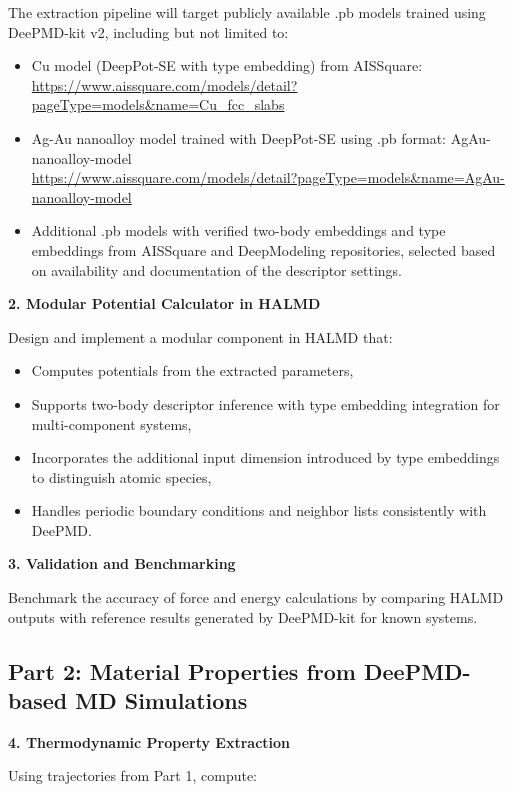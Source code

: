 \documentclass[12pt]{article}
\begin{document}
The extraction pipeline will target publicly available .pb models trained using DeePMD-kit v2, including but not limited to:
\begin{itemize}
    \item Cu model (DeepPot-SE with type embedding) from AISSquare: \url{https://www.aissquare.com/models/detail?pageType=models&name=Cu_fcc_slabs}
    \item Ag-Au nanoalloy model trained with DeepPot-SE using .pb format: AgAu-nanoalloy-model \\
    \url{https://www.aissquare.com/models/detail?pageType=models&name=AgAu-nanoalloy-model}
    \item Additional .pb models with verified two-body embeddings and type embeddings from AISSquare and DeepModeling repositories, selected based on availability and documentation of the descriptor settings.
\end{itemize}

\textbf{2. Modular Potential Calculator in HALMD}

Design and implement a modular component in HALMD that:
\begin{itemize}
    \item Computes potentials from the extracted parameters,
    \item Supports two-body descriptor inference with type embedding integration for multi-component systems,
    \item Incorporates the additional input dimension introduced by type embeddings to distinguish atomic species,
    \item Handles periodic boundary conditions and neighbor lists consistently with DeePMD.
\end{itemize}

\textbf{3. Validation and Benchmarking}

Benchmark the accuracy of force and energy calculations by comparing HALMD outputs with reference results generated by DeePMD-kit for known systems.

\subsection*{Part 2: Material Properties from DeePMD-based MD Simulations}
\textbf{4. Thermodynamic Property Extraction}

Using trajectories from Part 1, compute:
\end{document}
